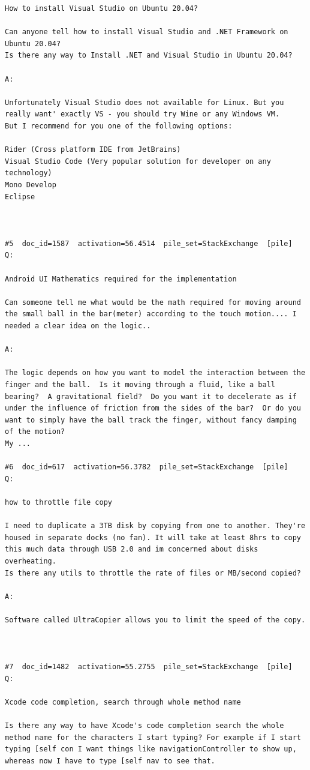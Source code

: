 \begin{verbatim}
How to install Visual Studio on Ubuntu 20.04?

Can anyone tell how to install Visual Studio and .NET Framework on Ubuntu 20.04?
Is there any way to Install .NET and Visual Studio in Ubuntu 20.04?

A:

Unfortunately Visual Studio does not available for Linux. But you really want' exactly VS - you should try Wine or any Windows VM.
But I recommend for you one of the following options:

Rider (Cross platform IDE from JetBrains)
Visual Studio Code (Very popular solution for developer on any technology)
Mono Develop
Eclipse



#5  doc_id=1587  activation=56.4514  pile_set=StackExchange  [pile]
Q:

Android UI Mathematics required for the implementation

Can someone tell me what would be the math required for moving around the small ball in the bar(meter) according to the touch motion.... I needed a clear idea on the logic..

A:

The logic depends on how you want to model the interaction between the finger and the ball.  Is it moving through a fluid, like a ball bearing?  A gravitational field?  Do you want it to decelerate as if under the influence of friction from the sides of the bar?  Or do you want to simply have the ball track the finger, without fancy damping of the motion?
My ...

#6  doc_id=617  activation=56.3782  pile_set=StackExchange  [pile]
Q:

how to throttle file copy

I need to duplicate a 3TB disk by copying from one to another. They're housed in separate docks (no fan). It will take at least 8hrs to copy this much data through USB 2.0 and im concerned about disks overheating. 
Is there any utils to throttle the rate of files or MB/second copied?

A:

Software called UltraCopier allows you to limit the speed of the copy.



#7  doc_id=1482  activation=55.2755  pile_set=StackExchange  [pile]
Q:

Xcode code completion, search through whole method name

Is there any way to have Xcode's code completion search the whole method name for the characters I start typing? For example if I start typing [self con I want things like navigationController to show up, whereas now I have to type [self nav to see that.


\end{verbatim}
